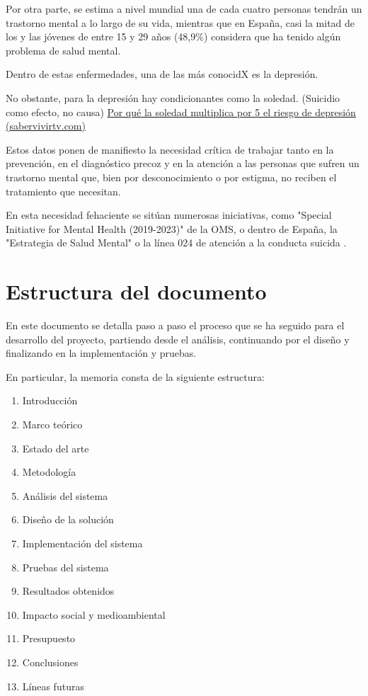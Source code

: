 Por otra parte, se estima a nivel mundial una de cada cuatro personas tendrán un trastorno mental a lo largo de su vida, mientras que en España, casi la mitad de los y las jóvenes de entre 15 y 29 años (48,9\%) considera que ha tenido algún problema de salud mental.

Dentro de estas enfermedades, una de las más conocidX es la depresión.


No obstante, para la depresión hay condicionantes como la soledad. (Suicidio como efecto, no causa) \href{https://www.sabervivirtv.com/medicina-general/soledad-multiplica-riesgo-depresion_6528}{Por qué la soledad multiplica por 5 el riesgo de depresión (sabervivirtv.com)} 


Estos datos ponen de manifiesto la necesidad crítica de trabajar tanto en la prevención, en el diagnóstico precoz y en la atención a las personas que sufren un trastorno mental que, bien por desconocimiento o por estigma, no reciben el tratamiento que necesitan.

En esta necesidad fehaciente se sitúan numerosas iniciativas, como "Special Initiative for Mental Health (2019-2023)" \cite{oms_salud_nodate} de la OMS, o dentro de España, la "Estrategia de Salud Mental" o la línea 024 de atención a la conducta suicida \cite{la_moncloa_minones_2023}.

\section{Estructura del documento}

En este documento se detalla paso a paso el proceso que se ha seguido para el desarrollo del proyecto, partiendo desde el análisis, continuando por el diseño y finalizando en la implementación y pruebas. 

En particular, la memoria consta de la siguiente estructura:
\begin{enumerate}
    \item Introducción
    \item Marco teórico
    \item Estado del arte
    \item Metodología 
    \item Análisis del sistema
    \item Diseño de la solución
    \item Implementación del sistema
    \item Pruebas del sistema
    \item Resultados obtenidos
    \item Impacto social y medioambiental
    \item Presupuesto
    \item Conclusiones
    \item Líneas futuras
\end{enumerate}